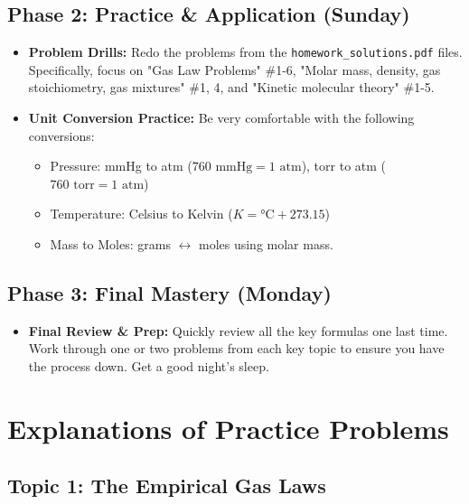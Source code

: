 \documentclass{article}
\begin{document}
\subsection{Phase 2: Practice \& Application (Sunday)}
\begin{itemize}
    \item \textbf{Problem Drills:} Redo the problems from the \texttt{homework\_solutions.pdf} files. Specifically, focus on "Gas Law Problems" \#1-6, "Molar mass, density, gas stoichiometry, gas mixtures" \#1, 4, and "Kinetic molecular theory" \#1-5.
    \item \textbf{Unit Conversion Practice:} Be very comfortable with the following conversions:
        \begin{itemize}
            \item Pressure: mmHg to atm ($760 \text{ mmHg} = 1 \text{ atm}$), torr to atm ($760 \text{ torr} = 1 \text{ atm}$)
            \item Temperature: Celsius to Kelvin ($K = \text{°C} + 273.15$)
            \item Mass to Moles: grams $\leftrightarrow$ moles using molar mass.
        \end{itemize}
\end{itemize}

\subsection{Phase 3: Final Mastery (Monday)}
\begin{itemize}
    \item \textbf{Final Review \& Prep:} Quickly review all the key formulas one last time. Work through one or two problems from each key topic to ensure you have the process down. Get a good night's sleep.
\end{itemize}

\section{Explanations of Practice Problems}

\subsection{Topic 1: The Empirical Gas Laws}
\end{document}

